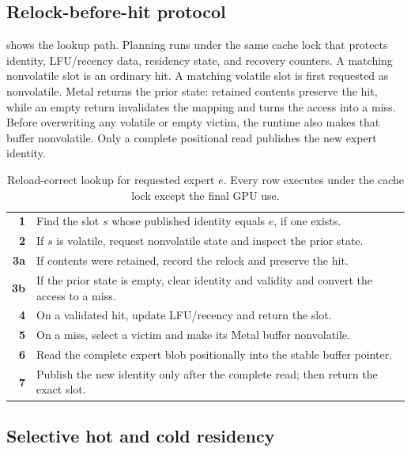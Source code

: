 \FloatBarrier

\subsection{Relock-before-hit protocol}

 shows the lookup path. Planning runs under the same
cache lock that protects identity, LFU/recency data, residency state, and
recovery counters. A matching nonvolatile slot is an ordinary hit. A matching
volatile slot is first requested as nonvolatile. Metal returns the prior state:
retained contents preserve the hit, while an empty return invalidates the
mapping and turns the access into a miss. Before overwriting any volatile or
empty victim, the runtime also makes that buffer nonvolatile. Only a complete
positional read publishes the new expert identity.

\begin{table}[ht]
\centering
\caption{Reload-correct lookup for requested expert $e$. Every row executes
under the cache lock except the final GPU use.}
\label{tab:lookup}
\small
\begin{tabularx}{0.96\linewidth}{>{\bfseries}r X}
\toprule
1 & Find the slot $s$ whose published identity equals $e$, if one exists. \\
2 & If $s$ is volatile, request nonvolatile state and inspect the prior state. \\
3a & If contents were retained, record the relock and preserve the hit. \\
3b & If the prior state is empty, clear identity and validity and convert the access to a miss. \\
4 & On a validated hit, update LFU/recency and return the slot. \\
5 & On a miss, select a victim and make its Metal buffer nonvolatile. \\
6 & Read the complete expert blob positionally into the stable buffer pointer. \\
7 & Publish the new identity only after the complete read; then return the exact slot. \\
\bottomrule
\end{tabularx}
\end{table}

\FloatBarrier

\subsection{Selective hot and cold residency}

